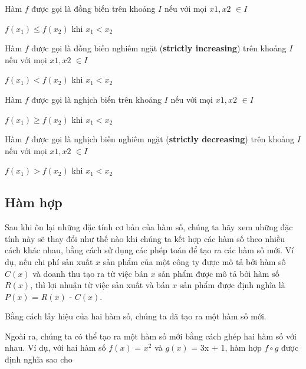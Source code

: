 \documentclass[a4paper,12pt,openany]{book}
\begin{document}
\clearpage
\begin{tcolorbox}[
    colframe=blue!10,      %
    colback=blue!5,    %
    coltitle=black,     %
    fonttitle=\bfseries,%
    title=Định nghĩa    %
    ]
Hàm $f$ được gọi là đồng biến trên khoảng $I$ nếu với mọi $x1, x2$ \(\in I\)

\begin{center}
   \(f(x_1) \leq f(x_2)\) khi $x_1 < x_2$
\end{center}

Hàm $f$ được gọi là đồng biến nghiêm ngặt (\textbf{strictly increasing}) trên khoảng $I$ nếu với mọi $x1, x2$ \(\in I\)

\begin{center}
   \(f(x_1) < f(x_2)\) khi $x_1 < x_2$
\end{center}

Hàm $f$ được gọi là nghịch biến trên khoảng $I$ nếu với mọi $x1, x2$ \(\in I\)

\begin{center}
   \(f(x_1) \geq f(x_2)\) khi $x_1 < x_2$
\end{center}

Hàm $f$ được gọi là nghịch biến nghiêm ngặt (\textbf{strictly decreasing}) trên khoảng $I$ nếu với mọi $x1, x2$ \(\in I\)

\begin{center}
   \(f(x_1) > f(x_2)\) khi $x_1 < x_2$
\end{center}

\end{tcolorbox}

\subsection{Hàm hợp}

Sau khi ôn lại những đặc tính cơ bản của hàm số, chúng ta hãy xem những đặc tính này sẽ thay đổi như thế nào khi chúng ta kết hợp các hàm số theo nhiều cách khác nhau, bằng cách sử dụng các phép toán để tạo ra các hàm số mới. Ví dụ, nếu chi phí sản xuất $x$ sản phẩm của một công ty được mô tả bởi hàm số $C(x)$ và doanh thu tạo ra từ việc bán $x$ sản phẩm được mô tả bởi hàm số $R(x)$, thì lợi nhuận từ việc sản xuất và bán $x$ sản phẩm được định nghĩa là $P(x)$ = $R(x)$ - $C(x)$.
\par
\vspace{10pt}
Bằng cách lấy hiệu của hai hàm số, chúng ta đã tạo ra một hàm số mới.
\par
\vspace{10pt}
Ngoài ra, chúng ta có thể tạo ra một hàm số mới bằng cách ghép hai hàm số với nhau. Ví dụ, với hai hàm số $f(x)$ = \(x^2\) và $g(x)$ = 3x + 1, hàm hợp $f \circ g$ được định nghĩa sao cho 
\end{document}
